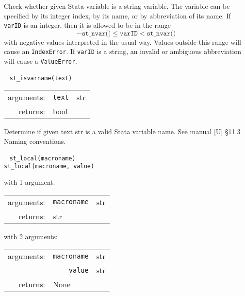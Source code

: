 \documentclass{article}
\begin{document}
			\vspace{1.5mm}
			\noindent Check whether given Stata variable is a string variable. The variable can be specified by its integer index, by its name, or by abbreviation of its name. If \lstinline{varID} is an integer, then it is allowed to be in the range
			\[
				-\texttt{st\_nvar()} \leq \texttt{varID} < \texttt{st\_nvar()}
			\]
			with negative values interpreted in the usual way. Values outside this range will cause an \lstinline{IndexError}. If \lstinline{varID} is a string, an invalid or ambiguous abbreviation will cause a \lstinline{ValueError}. \newline
		
			
			\ \newline
			\noindent \lstinline$st_isvarname(text)$
								
			\vspace{1.5mm}
			\noindent 
			\indent \begin{tabular}{rrl}
					arguments: & \texttt{text} & str \\
					returns: & \multicolumn{2}{l}{bool}
				\end{tabular}
								
			\vspace{1.5mm}
			\noindent Determine if given text str is a valid Stata variable name. See manual [U] \S11.3 Naming conventions. \newline
			
			
			\ \newline
			\noindent \lstinline$st_local(macroname)$ \\
			\noindent \lstinline$st_local(macroname, value)$
								
			\vspace{1.5mm}
			\noindent 
			\indent with 1 argument:
			
			\indent \qquad \begin{tabular}{rrl}
					arguments: & \texttt{macroname} & str \\
					returns: & \multicolumn{2}{l}{str}
				\end{tabular}
								
			\vspace{1.5mm}
			\noindent
			\indent with 2 arguments:
			
			\indent \qquad \begin{tabular}{rrl}
					arguments: & \texttt{macroname} & str \\
					  & \texttt{value} & str \\
					returns: & \multicolumn{2}{l}{None}
				\end{tabular}
								
\end{document}
